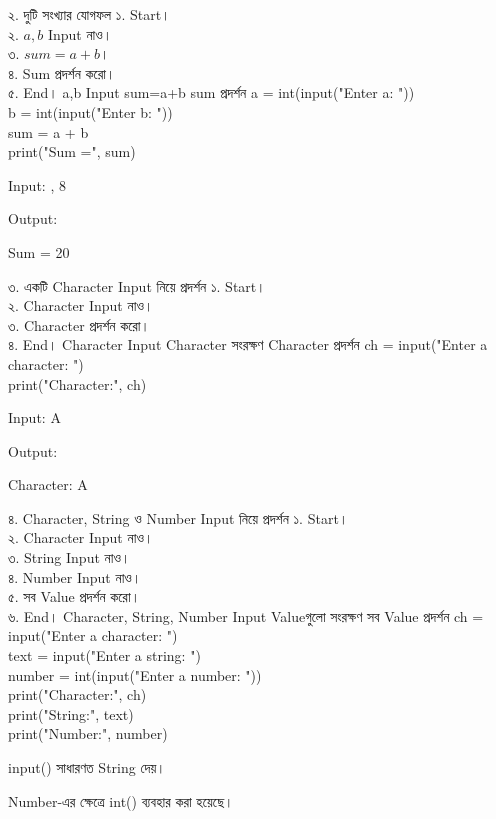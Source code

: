 
\exerciseTable
{২. দুটি সংখ্যার যোগফল}
{
১. Start।\\
২. \(a,b\) Input নাও।\\
৩. \(sum=a+b\)।\\
৪. Sum প্রদর্শন করো।\\
৫. End।
}
{
\linearflow
{a,b Input}
{sum=a+b}
{sum প্রদর্শন}
}
{
a = int(input("Enter a: "))\\
b = int(input("Enter b: "))\\
sum = a + b\\
print("Sum =", sum)
}
{
Input:
\textenglish{, 8}

\medskip

Output:

\textenglish{\ttfamily Sum = 20}
}


\exerciseTable
{৩. একটি Character Input নিয়ে প্রদর্শন}
{
১. Start।\\
২. Character Input নাও।\\
৩. Character প্রদর্শন করো।\\
৪. End।
}
{
\linearflow
{Character Input}
{Character সংরক্ষণ}
{Character প্রদর্শন}
}
{
ch = input("Enter a character: ")\\
print("Character:", ch)
}
{
Input:
\textenglish{\ttfamily A}

\medskip

Output:

\textenglish{\ttfamily Character: A}
}


\exerciseTable
{৪. Character, String ও Number Input নিয়ে প্রদর্শন}
{
১. Start।\\
২. Character Input নাও।\\
৩. String Input নাও।\\
৪. Number Input নাও।\\
৫. সব Value প্রদর্শন করো।\\
৬. End।
}
{
\linearflow
{Character, String, Number Input}
{Valueগুলো সংরক্ষণ}
{সব Value প্রদর্শন}
}
{
ch = input("Enter a character: ")\\
text = input("Enter a string: ")\\
number = int(input("Enter a number: "))\\[0.5mm]
print("Character:", ch)\\
print("String:", text)\\
print("Number:", number)
}
{
\textenglish{\ttfamily input()}
সাধারণত String দেয়।

\medskip

Number-এর ক্ষেত্রে
\textenglish{\ttfamily int()}
ব্যবহার করা হয়েছে।
}

